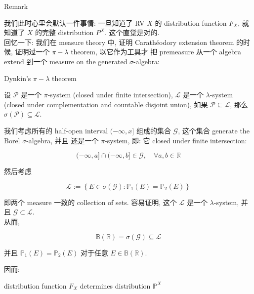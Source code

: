 \documentclass{qlnotes-export}
\begin{document}
\begin{qlremark}{Remark}

我们此时心里会默认一件事情: 一旦知道了 RV \(X\) 的 distribution function \(F_{X}\), 就知道了 \(X\) 的完整 distribution \(P^{X}\). 这个直觉是对的.\\
回忆一下: 我们在 measure theory 中, 证明 Carathéodory extension theorem 的时候, 证明过一个 \(\pi - \lambda\) theorem, 以它作为工具才 把 premeasure 从一个 algebra extend 到一个 measure on the generated \(\sigma\)-algebra:

\begin{theorem}{Dynkin's \(\pi - \lambda\) theorem}\label{thm-02-random-variables-dynkins-pi-lambda-theorem}

设 \(\mathcal{P}\) 是一个 \(\pi\)-system (closed under finite intersection), \(\mathcal{L}\) 是一个 \(\lambda\)-system (closed under complementation and countable disjoint union), 如果 \(\mathcal{P} \subseteq \mathcal{L}\), 那么 \(\sigma(\mathcal{P}) \subseteq \mathcal{L}\).

\end{theorem}

我们考虑所有的 half-open interval \(( - \infty,x\rbrack\) 组成的集合 \(\mathcal{G}\), 这个集合 generate the Borel \(\sigma\)-algebra, 并且 还是一个 \(\pi\)-system, 即: 它 closed under finite intersection:

\[( - \infty,a\rbrack \cap ( - \infty,b\rbrack \in \mathcal{G},\quad\forall a,b \in {\mathbb{R}}\]

然后考虑

\[\mathcal{L} := \left\{ {E \in \sigma(\mathcal{G}):{\mathbb{P}}_{1}(E) = {\mathbb{P}}_{2}(E)} \right\}\]

即两个 measure 一致的 collection of sets. 容易证明, 这个 \(\mathcal{L}\) 是一个 \(\lambda\)-system, 并且 \(\mathcal{G} \subset \mathcal{L}\).\\
从而,

\[{\mathbb{B}}({\mathbb{R}}) = \sigma(\mathcal{G}) \subseteq \mathcal{L}\]

并且 \({\mathbb{P}}_{1}(E) = {\mathbb{P}}_{2}(E)\) 对于任意 \(E \in {\mathbb{B}}({\mathbb{R}})\).

因而:

\begin{corollary}{distribution function \(F_{X}\) determines distribution
\({\mathbb{P}}^{X}\)}\label{cor-02-random-variables-distribution-function-f-x-determines-distribution-mathbb-p-x}


\end{corollary}
\end{qlremark}
\end{document}
